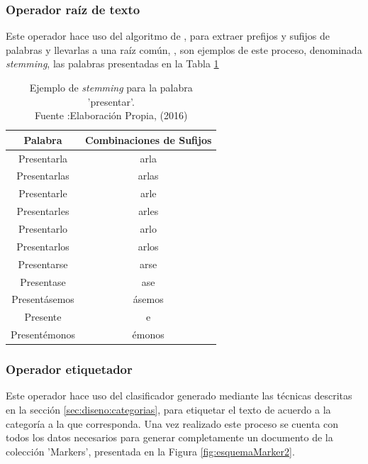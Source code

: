 \subsubsection*{Operador raíz de texto}
\label{subsubsec:6op}

Este operador hace uso del algoritmo de \cite{Porter}, para extraer prefijos y sufijos de palabras y llevarlas a una raíz común, \cite{StemmingLema}, son ejemplos de este proceso, denominada \textit{stemming}, las palabras presentadas en la Tabla \ref{tab:ejstemming}

\begin{table}[H]
\centering
\caption[Ejemplo de \textit{stemming} para la palabra 'presentar'.]{Ejemplo de \textit{stemming} para la palabra 'presentar'.\\Fuente :Elaboración Propia, (2016)}
\label{tab:ejstemming}
\begin{tabular}{|c|c|}
\hline
\textbf{Palabra} & \textbf{Combinaciones de Sufijos} \\ \hline
Presentarla      & arla                              \\ \hline
Presentarlas     & arlas                             \\ \hline
Presentarle      & arle                              \\ \hline
Presentarles     & arles                             \\ \hline
Presentarlo      & arlo                              \\ \hline
Presentarlos     & arlos                             \\ \hline
Presentarse      & arse                              \\ \hline
Presentase       & ase                               \\ \hline
Presentásemos    & ásemos                            \\ \hline
Presente         & e                                 \\ \hline
Presentémonos    & émonos                            \\ \hline
\end{tabular}
\end{table}

\subsubsection*{Operador etiquetador}
\label{subsubsec:7op}

Este operador hace uso del clasificador generado mediante las técnicas descritas en la sección \ref{sec:diseno:categorias}, para etiquetar el texto de acuerdo a la categoría a la que corresponda. Una vez realizado este proceso se cuenta con todos los datos necesarios para generar completamente un documento de la colección 'Markers', presentada en la Figura \ref{fig:esquemaMarker2}.

